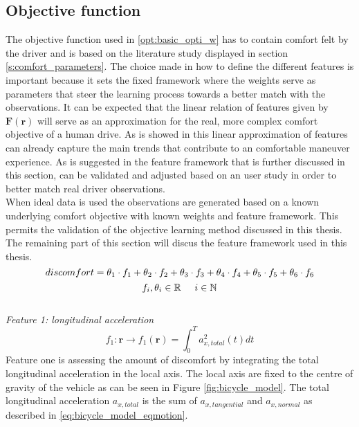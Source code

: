 \subsection{Objective function}\label{s:obj}
The objective function used in \ref{opt:basic_opti_w} has to contain comfort felt by the driver and is based on the literature study displayed in section \ref{s:comfort_parameters}. The choice made in how to define the different features is important because it sets the fixed framework where the weights serve as parameters that steer the learning process towards a better match with the observations. It can be expected that the linear relation of features given by $\bm{F}(\bm{r})$ will serve as an approximation for the real, more complex comfort objective of a human drive. As is showed in \cite{Kuderer2015a} this linear approximation of features can already capture  the main trends that contribute to an comfortable maneuver experience. As is suggested in \cite{Kuderer2015a} the feature framework that is further discussed in this section, can be validated and adjusted based on an user study in order to better match real driver observations. \\

When ideal data is used the observations are generated based on a known underlying comfort objective with known weights and feature framework. This permits the validation of the objective learning method discussed in this thesis. The remaining part of this section will discus the feature framework used in this thesis.\\


\begin{equation}\label{eq:obj}
discomfort = \theta_1 \cdot f_1 +\theta_2 \cdot f_2 +\theta_3 \cdot f_3 +\theta_4 \cdot f_4 +\theta_5 \cdot f_5 +\theta_6 \cdot f_6 \\
\end{equation}
\[	f_i, \theta_i \in \mathbb{R} \hspace{5mm}
i \in \mathbb{N}\]\\


\textit{Feature 1: longitudinal acceleration}
\begin{equation}\label{eq:flong_acc}
f_{1}:\bm{r}\xrightarrow{}f_1(\bm{r})=\int_{0}^{T}a_{x,total}^{2}(t) dt
\end{equation}
Feature one is assessing the amount of discomfort by integrating the total longitudinal acceleration in the local axis. The local axis are fixed to the centre of gravity of the vehicle as can be seen in Figure \ref{fig:bicycle_model}. The total longitudinal acceleration  $a_{x,total} $ is the sum of  $ a_{x,tangential}$ and $a_{x,normal}$ as described in \ref{eq:bicycle_model_eqmotion}. \\

